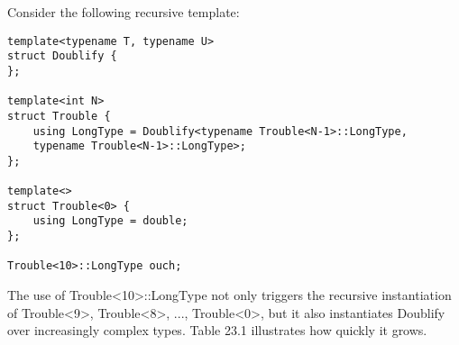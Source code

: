 Consider the following recursive template:

\begin{lstlisting}[style=styleCXX]
template<typename T, typename U>
struct Doublify {
};

template<int N>
struct Trouble {
	using LongType = Doublify<typename Trouble<N-1>::LongType,
	typename Trouble<N-1>::LongType>;
};

template<>
struct Trouble<0> {
	using LongType = double;
};

Trouble<10>::LongType ouch;
\end{lstlisting}

The use of Trouble<10>::LongType not only triggers the recursive instantiation of Trouble<9>, Trouble<8>, ..., Trouble<0>, but it also instantiates Doublify over increasingly complex types. Table 23.1 illustrates how quickly it grows.

